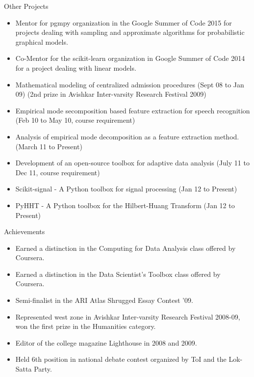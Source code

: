 \documentclass{resume} %
\begin{document}
\begin{rSection}{Other Projects}
    \begin{itemize}
\item Mentor for pgmpy organization in the Google Summer of Code 2015 for projects dealing with sampling and approximate algorithms for probabilistic graphical models.
\item Co-Mentor for the scikit-learn organization in Google Summer of Code 2014 for a project dealing with linear models.
\item Mathematical modeling of centralized admission procedures (Sept 08 to Jan 09) (2nd prize in Avishkar Inter-varsity Research Festival 2009)
\item Empirical mode secomposition based feature extraction for speech recognition (Feb 10 to May 10, course requirement)
\item Analysis of empirical mode decomposition as a feature extraction method. (March 11 to Present)
\item Development of an open-source toolbox for adaptive data analysis (July 11 to Dec 11, course requirement)
\item Scikit-signal - A Python toolbox for signal processing (Jan 12 to Present)
\item PyHHT - A Python toolbox for the Hilbert-Huang Transform (Jan 12 to Present)
    \end{itemize}
\end{rSection}


\begin{rSection}{Achievements}
    \begin{itemize}
        \item Earned a distinction in the Computing for Data Analysis class
            offered by Coursera.
        \item Earned a distinction in the Data Scientist’s Toolbox class
            offered by Coursera.
        \item Semi-finalist in the ARI Atlas Shrugged Essay Contest ’09.
        \item Represented west zone in Avishkar Inter-varsity Research Festival
            2008-09, won the first prize in the Humanities category.
        \item Editor of the college magazine Lighthouse in 2008 and 2009.
        \item Held 6th position in national debate contest organized by ToI and
            the Lok-Satta Party.
    \end{itemize}
\end{rSection}
\end{document}
